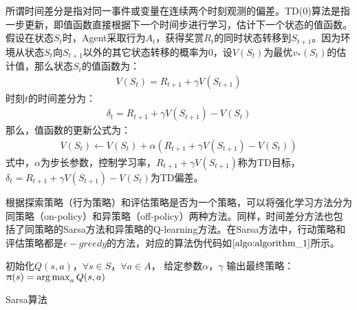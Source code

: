 所谓时间差分是指对同一事件或变量在连续两个时刻观测的偏差。TD(0)算法是指一步更新，即值函数直接根据下一个时间步进行学习，估计下一个状态的值函数。
假设在状态$S_{t}$时，Agent采取行为$A_{t}$，获得奖赏$R_{t}$的同时状态转移到$S_{t+1}$。因为环境从状态$S_{t}$向$S_{t+1}$以外的其它状态转移的概率为0，设$V(S_{t})$为最优$v_{*}(S_{t})$的估计值，那么状态$S_{t}$的值函数为：
\begin{equation}
\begin{aligned}
V(S_{t})=R_{t+1}+\gamma V(S_{t+1})
\end{aligned}
\end{equation}
时刻$t$的时间差分为：
\begin{equation}
\begin{aligned}
\delta_{t}=R_{t+1}+\gamma V(S_{t+1})-V(S_{t})
\end{aligned}
\end{equation}
那么，值函数的更新公式为：
\begin{equation}
\begin{aligned}
V(S_{t}) \gets V(S_{t})+\alpha (R_{t+1}+\gamma V(S_{t+1})-V(S_{t}))
\end{aligned}
\end{equation}
式中，$\alpha$为步长参数，控制学习率，$R_{t+1}+\gamma V(S_{t+1})$称为TD目标，$\delta_{t}=R_{t+1}+\gamma V(S_{t+1})-V(S_{t})$为TD偏差。

根据探索策略（行为策略）和评估策略是否为一个策略，可以将强化学习方法分为同策略（on-policy）和异策略（off-policy）两种方法。同样，时间差分方法也包括了同策略的Sarsa方法和异策略的Q-learning方法。在Sarsa方法中，行动策略和评估策略都是$\epsilon-greedy$的方法，对应的算法伪代码如$\ref{algo:algorithm_1}$所示。

\begin{algorithm}[htbp]
\small
\SetAlgoLined
{} 
初始化$Q(s,a)$，$\forall s \in S$，$\forall a \in A$， 给定参数$\alpha$，$\gamma$\;
输出最终策略：$\uppi(s)=\operatorname*{arg\,max}_{a}Q(s,a)$\;
\caption{Sarsa算法}
\label{algo:algorithm_1}
\end{algorithm}

